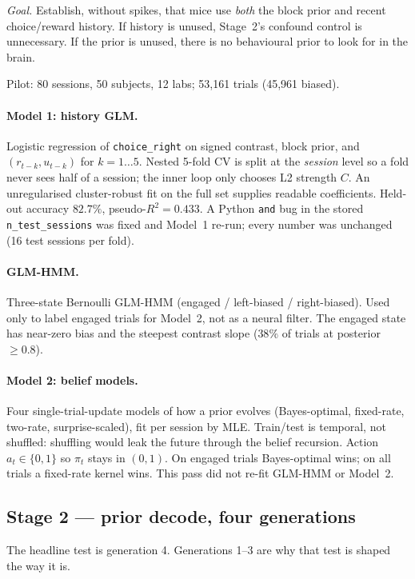 \documentclass[11pt,a4paper]{article}
\begin{document}
\textit{Goal.} Establish, without spikes, that mice use \emph{both} the block
prior and recent choice/reward history. If history is unused, Stage~2's
confound control is unnecessary. If the prior is unused, there is no
behavioural prior to look for in the brain.

Pilot: 80 sessions, 50 subjects, 12 labs; 53{,}161 trials (45{,}961 biased).

\paragraph{Model 1: history GLM.}
Logistic regression of \texttt{choice\_right} on signed contrast, block
prior, and $(r_{t-k}, u_{t-k})$ for $k=1{\ldots}5$. Nested 5-fold CV is split
at the \emph{session} level so a fold never sees half of a session; the inner
loop only chooses L2 strength $C$. An unregularised cluster-robust fit on the
full set supplies readable coefficients. Held-out accuracy $82.7\%$,
pseudo-$R^2=0.433$. A Python \texttt{and} bug in the stored
\texttt{n\_test\_sessions} was fixed and Model~1 re-run; every number was
unchanged (16 test sessions per fold).

\paragraph{GLM-HMM.}
Three-state Bernoulli GLM-HMM (engaged / left-biased / right-biased). Used
only to label engaged trials for Model~2, not as a neural filter. The engaged
state has near-zero bias and the steepest contrast slope ($38\%$ of trials at
posterior $\ge 0.8$).

\paragraph{Model 2: belief models.}
Four single-trial-update models of how a prior evolves (Bayes-optimal,
fixed-rate, two-rate, surprise-scaled), fit per session by MLE.
Train/test is temporal, not shuffled: shuffling would leak the future through
the belief recursion. Action $a_t\in\{0,1\}$ so $\pi_t$ stays in $(0,1)$.
On engaged trials Bayes-optimal wins; on all trials a fixed-rate kernel wins.
This pass did not re-fit GLM-HMM or Model~2.

\subsection{Stage 2 --- prior decode, four generations}

The headline test is generation 4. Generations 1--3 are why that test is
shaped the way it is.
\end{document}
